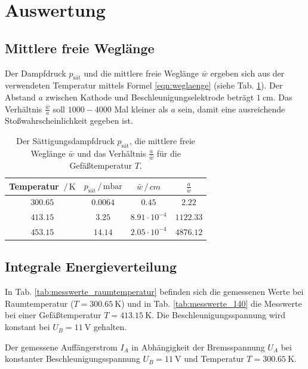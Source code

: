 \section{Auswertung}
\subsection{Mittlere freie Weglänge}
Der Dampfdruck $p_\text{sät}$ und die mittlere freie Weglänge $\bar{w}$ ergeben sich aus der verwendeten Temperatur mittels Formel \ref{eqn:weglaenge} (siehe Tab. \ref{tab:weglaenge}).
Der Abstand $a$ zwischen Kathode und Beschleunigungselektrode beträgt $\SI{1}{\centi\metre}$.
Das Verhältnis $\frac{\bar{w}}{a}$ soll $1000 - 4000$ Mal kleiner als $a$ sein, damit eine ausreichende Stoßwahrscheinlichkeit gegeben ist.
\begin{table}
    \centering
    \begin{tabular}{cccc}
        \toprule
        Temperatur $\,/\, \si{\kelvin}$ & $p_\text{sät} \,/\, \si{\milli\bar}$ & $\bar{w} \,/\, \si{cm}$ & $\frac{a}{\bar{w}}$ \\
        \midrule
        $300.65$ & $0.0064$ & $0.45$ & $2.22$ \\
        $413.15$ & $3.25$ & $8.91 \cdot 10^{-4}$ & $1122.33$ \\
        $453.15$ & $14.14$ & $2.05 \cdot 10^{-4}$ & $4876.12$ \\
        \bottomrule
    \end{tabular}
    \caption{Der Sättigungsdampfdruck $p_\text{sät}$, die mittlere freie Weglänge $\bar{w}$ und das Verhältnis $\frac{a}{\bar{w}}$ für die Gefäßtemperatur $T$.}
    \label{tab:weglaenge}
\end{table}

\FloatBarrier
\subsection{Integrale Energieverteilung}
In Tab. \ref{tab:messwerte_raumtemperatur} befinden sich die gemessenen Werte bei Raumtemperatur ($T=\SI{300.65}{\kelvin}$) und in Tab. \ref{tab:messwerte_140} die Messwerte bei einer Gefäßtemperatur $T=\SI{413.15}{\kelvin}$.
Die Beschleunigungsspannung wird konstant bei $U_B = \SI{11}{\volt}$ gehalten.
\begin{table}
    \centering
    \caption{Der gemessene Auffängerstrom $I_A$ in Abhängigkeit der Bremsspannung $U_A$ bei konstanter Beschleunigungsspannung $U_B = \SI{11}{\volt}$ und Temperatur $T = \SI{300.65}{\kelvin}$.}
    \label{tab:messwerte_raumtemperatur}  
\end{table}

